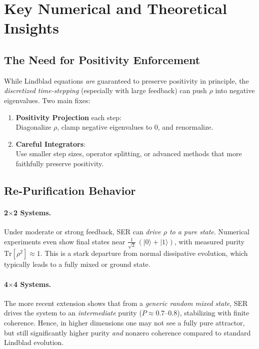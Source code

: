 \documentclass[12pt]{article}
\begin{document}
\section{Key Numerical and Theoretical Insights}

\subsection{The Need for Positivity Enforcement}
While Lindblad equations \emph{are} guaranteed to preserve positivity in principle, the \emph{discretized time-stepping} (especially with large feedback) can push $\rho$ into negative eigenvalues. Two main fixes:

\begin{enumerate}
\item \textbf{Positivity Projection} each step:\\
Diagonalize $\rho$, clamp negative eigenvalues to 0, and renormalize.

\item \textbf{Careful Integrators}:\\
Use smaller step sizes, operator splitting, or advanced methods that more faithfully preserve positivity.
\end{enumerate}

\subsection{Re-Purification Behavior}
\paragraph{2$\times$2 Systems.} Under moderate or strong feedback, SER can \emph{drive $\rho$ to a pure state}. Numerical experiments even show final states near $\tfrac1{\sqrt2}\,(|0\rangle + |1\rangle)$, with measured purity $\mathrm{Tr}[\rho^2] \approx 1$. This is a stark departure from normal dissipative evolution, which typically leads to a fully mixed or ground state.

\paragraph{4$\times$4 Systems.} The more recent extension shows that from a \emph{generic random mixed state}, SER drives the system to an \emph{intermediate} purity ($P \approx 0.7\text{--}0.8$), stabilizing with finite coherence. Hence, in higher dimensions one may not see a fully pure attractor, but still significantly higher purity \emph{and} nonzero coherence compared to standard Lindblad evolution.
\end{document}
